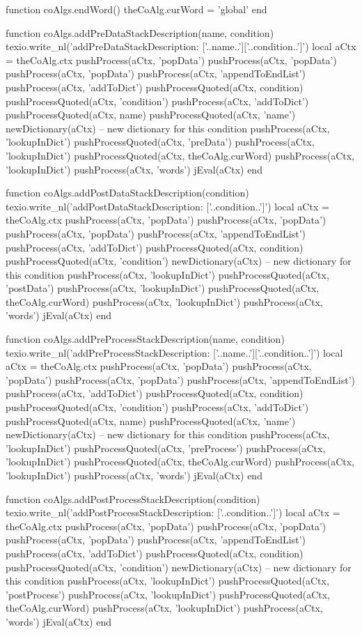 function coAlgs.endWord()
  theCoAlg.curWord = 'global'
end

function coAlgs.addPreDataStackDescription(name, condition)
  texio.write_nl('addPreDataStackDescription: ['..name..']['..condition..']')
  local aCtx = theCoAlg.ctx
  pushProcess(aCtx, 'popData')
  pushProcess(aCtx, 'popData')
  pushProcess(aCtx, 'popData')
  pushProcess(aCtx, 'appendToEndList')
  pushProcess(aCtx, 'addToDict')
  pushProcessQuoted(aCtx, condition)
  pushProcessQuoted(aCtx, 'condition')
  pushProcess(aCtx, 'addToDict')
  pushProcessQuoted(aCtx, name)
  pushProcessQuoted(aCtx, 'name')
  newDictionary(aCtx) -- new dictionary for this condition
  pushProcess(aCtx, 'lookupInDict')
  pushProcessQuoted(aCtx, 'preData')
  pushProcess(aCtx, 'lookupInDict')
  pushProcessQuoted(aCtx, theCoAlg.curWord)
  pushProcess(aCtx, 'lookupInDict')
  pushProcess(aCtx, 'words')
  jEval(aCtx)
end

function coAlgs.addPostDataStackDescription(condition)
  texio.write_nl('addPostDataStackDescription: ['..condition..']')
  local aCtx = theCoAlg.ctx
  pushProcess(aCtx, 'popData')
  pushProcess(aCtx, 'popData')
  pushProcess(aCtx, 'popData')
  pushProcess(aCtx, 'appendToEndList')
  pushProcess(aCtx, 'addToDict')
  pushProcessQuoted(aCtx, condition)
  pushProcessQuoted(aCtx, 'condition')
  newDictionary(aCtx) -- new dictionary for this condition
  pushProcess(aCtx, 'lookupInDict')
  pushProcessQuoted(aCtx, 'postData')
  pushProcess(aCtx, 'lookupInDict')
  pushProcessQuoted(aCtx, theCoAlg.curWord)
  pushProcess(aCtx, 'lookupInDict')
  pushProcess(aCtx, 'words')
  jEval(aCtx)
end

function coAlgs.addPreProcessStackDescription(name, condition)
  texio.write_nl('addPreProcessStackDescription: ['..name..']['..condition..']')
  local aCtx = theCoAlg.ctx
  pushProcess(aCtx, 'popData')
  pushProcess(aCtx, 'popData')
  pushProcess(aCtx, 'popData')
  pushProcess(aCtx, 'appendToEndList')
  pushProcess(aCtx, 'addToDict')
  pushProcessQuoted(aCtx, condition)
  pushProcessQuoted(aCtx, 'condition')
  pushProcess(aCtx, 'addToDict')
  pushProcessQuoted(aCtx, name)
  pushProcessQuoted(aCtx, 'name')
  newDictionary(aCtx) -- new dictionary for this condition
  pushProcess(aCtx, 'lookupInDict')
  pushProcessQuoted(aCtx, 'preProcess')
  pushProcess(aCtx, 'lookupInDict')
  pushProcessQuoted(aCtx, theCoAlg.curWord)
  pushProcess(aCtx, 'lookupInDict')
  pushProcess(aCtx, 'words')
  jEval(aCtx)
end

function coAlgs.addPostProcessStackDescription(condition)
  texio.write_nl('addPostProcessStackDescription: ['..condition..']')
  local aCtx = theCoAlg.ctx
  pushProcess(aCtx, 'popData')
  pushProcess(aCtx, 'popData')
  pushProcess(aCtx, 'popData')
  pushProcess(aCtx, 'appendToEndList')
  pushProcess(aCtx, 'addToDict')
  pushProcessQuoted(aCtx, condition)
  pushProcessQuoted(aCtx, 'condition')
  newDictionary(aCtx) -- new dictionary for this condition
  pushProcess(aCtx, 'lookupInDict')
  pushProcessQuoted(aCtx, 'postProcess')
  pushProcess(aCtx, 'lookupInDict')
  pushProcessQuoted(aCtx, theCoAlg.curWord)
  pushProcess(aCtx, 'lookupInDict')
  pushProcess(aCtx, 'words')
  jEval(aCtx)
end


